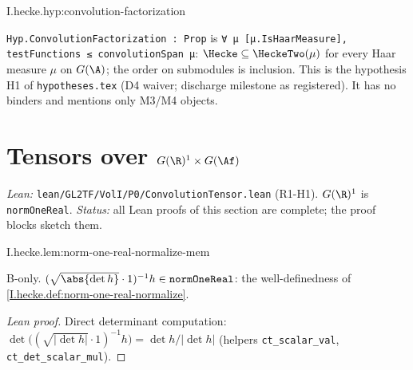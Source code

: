 \begin{hypothesis}
\end{hypothesis}
\begin{tfformal}{I.hecke.hyp:convolution-factorization}
\begin{tffidelity}
\texttt{Hyp.ConvolutionFactorization : Prop} is \texttt{∀ μ [μ.IsHaarMeasure], testFunctions ≤ convolutionSpan μ}: $\Hecke\subseteq\HeckeTwo(\mu)$ for every Haar measure $\mu$ on $G(\A)$; the order on submodules is inclusion. This is the hypothesis H1 of \texttt{hypotheses.tex} (D4 waiver; discharge milestone as registered). It has no binders and mentions only M3/M4 objects.
\end{tffidelity}
\end{tfformal}

\section{\texorpdfstring{Tensors over $G(\R)^1\times G(\Af)$}{Tensors over G(R)1 x G(Af)}}\label{sec:hecke-tensor}

\noindent\emph{Lean:} \texttt{lean/GL2TF/VolI/P0/ConvolutionTensor.lean} (R1-H1). $G(\R)^1$ is \texttt{normOneReal}. \emph{Status:} all Lean proofs of this section are complete; the proof blocks sketch them.

\begin{lemma}
\bonly
{}
\end{lemma}
\begin{tfformal}{I.hecke.lem:norm-one-real-normalize-mem}
\begin{tffidelity}
B-only. $(\sqrt{\abs{\det h}}\cdot1)^{-1}h\in\texttt{normOneReal}$: the well-definedness of \cref{I.hecke.def:norm-one-real-normalize}.
\end{tffidelity}
\end{tfformal}
\begin{proof}[Lean proof]
Direct determinant computation: $\det\bigl((\sqrt{|\det h|}\cdot1)^{-1}h\bigr)=\det h/|\det h|$ (helpers \texttt{ct\_scalar\_val}, \texttt{ct\_det\_scalar\_mul}).
\end{proof}


